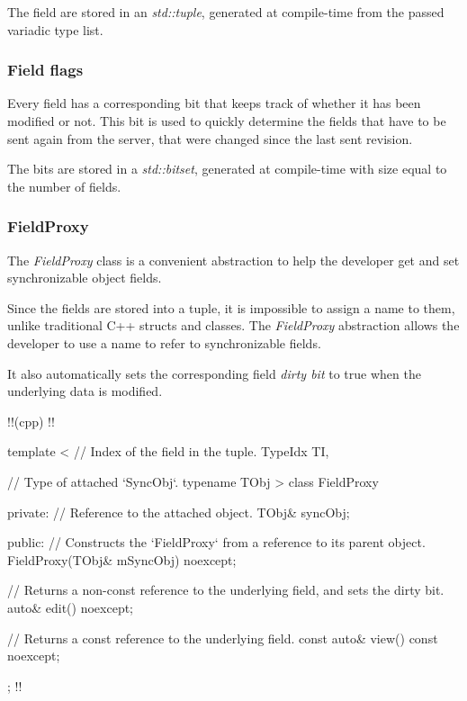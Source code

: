 \documentclass{report}
\begin{document}
                    The field are stored in an \emph{std::tuple}, generated at compile-time from the passed variadic type list.

                \subsubsection{Field flags}

                    Every field has a corresponding bit that keeps track of whether it has been modified or not. 
                    This bit is used to quickly determine the fields that have to be sent again from the server, that were changed since the last sent revision.

                    The bits are stored in a \emph{std::bitset}, generated at compile-time with size equal to the number of fields.

                \subsubsection{FieldProxy}

                    The \emph{FieldProxy} class is a convenient abstraction to help the developer get and set synchronizable object fields.

                    Since the fields are stored into a tuple, it is impossible to assign a name to them, unlike traditional C++ structs and classes.
                    The \emph{FieldProxy} abstraction allows the developer to use a name to refer to synchronizable fields.

                    It also automatically sets the corresponding field \emph{dirty bit} to true when the underlying data is modified.

!!(cpp)
!!{
    template
    <
        // Index of the field in the tuple.
        TypeIdx TI, 

        // Type of attached `SyncObj`.
        typename TObj
    > 
    class FieldProxy
    {
        private:
            // Reference to the attached object.
            TObj& syncObj;

        public:
            // Constructs the `FieldProxy` from a reference to its parent object.
            FieldProxy(TObj& mSyncObj) noexcept;

            // Returns a non-const reference to the underlying field, and sets the dirty bit.
            auto& edit() noexcept;

            // Returns a const reference to the underlying field.
            const auto& view() const noexcept;
    };
!!}
\end{document}
